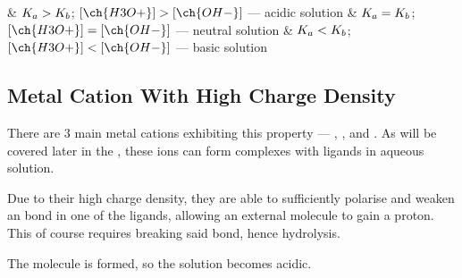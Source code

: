 			\begin{bulletlist}
				& $K_{a} > K_{b}$;\hspace{4mm} $[\ch{H3O+}] > [\ch{OH-}]$ \hspace{3mm} --- \hspace{3mm} acidic solution
				& $K_{a} = K_{b}$;\hspace{4mm} $[\ch{H3O+}] = [\ch{OH-}]$ \hspace{3mm} --- \hspace{3mm} neutral solution
				& $K_{a} < K_{b}$;\hspace{4mm} $[\ch{H3O+}] < [\ch{OH-}]$ \hspace{3mm} --- \hspace{3mm} basic solution
			\end{bulletlist}



		\subsection{Metal Cation With High Charge Density}

			There are 3 main metal cations exhibiting this property --- , , and . As will be covered later
			in the , these ions can form complexes with  ligands in aqueous solution.

			Due to their high charge density, they are able to sufficiently polarise and weaken an  bond in one of the ligands,
			allowing an external  molecule to gain a proton. This of course requires breaking said  bond, hence hydrolysis.

			The  molecule is formed, so the solution becomes acidic.




